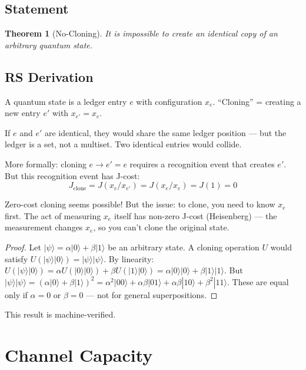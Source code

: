 \documentclass[12pt,a4paper]{article}
\newtheorem{theorem}{Theorem}[section]
\theoremstyle{definition}
\theoremstyle{remark}
\begin{document}
\subsection{Statement}

\begin{theorem}[No-Cloning]
It is impossible to create an identical copy of an arbitrary quantum state.
\end{theorem}

\subsection{RS Derivation}

A quantum state is a ledger entry $e$ with configuration $x_e$.
``Cloning'' = creating a new entry $e'$ with $x_{e'} = x_e$.

If $e$ and $e'$ are identical, they would share the same ledger position --- 
but the ledger is a set, not a multiset. Two identical entries would collide.

More formally: cloning $e \to e' = e$ requires a recognition event that creates 
$e'$. But this recognition event has J-cost:
\begin{equation}
J_\mathrm{clone} = J(x_e / x_{e'}) = J(x_e/x_e) = J(1) = 0
\end{equation}

Zero-cost cloning seems possible! But the issue: to clone, you need to know $x_e$ first.
The act of measuring $x_e$ itself has non-zero J-cost (Heisenberg) --- the measurement 
changes $x_e$, so you can't clone the original state.

\begin{proof}
Let $|\psi\rangle = \alpha|0\rangle + \beta|1\rangle$ be an 
arbitrary state. A cloning operation $U$ would satisfy
$U(|\psi\rangle|0\rangle) = |\psi\rangle|\psi\rangle$.
By linearity: $U(|\psi\rangle|0\rangle) = \alpha U(|0\rangle|0\rangle) + \beta U(|1\rangle|0\rangle)
= \alpha|0\rangle|0\rangle + \beta|1\rangle|1\rangle$.
But $|\psi\rangle|\psi\rangle = (\alpha|0\rangle + \beta|1\rangle)^2 = \alpha^2|00\rangle + \alpha\beta|01\rangle + \alpha\beta|10\rangle + \beta^2|11\rangle$.
These are equal only if $\alpha = 0$ or $\beta = 0$ --- not for general superpositions.
\end{proof}

This result is machine-verified.

\section{Channel Capacity}
\end{document}
